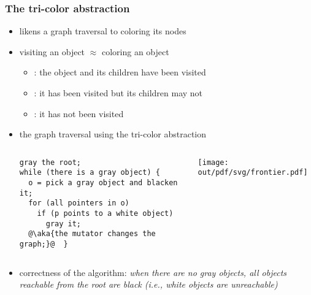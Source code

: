 \documentclass[11pt,dvipdfmx]{beamer}
\newcommand{\ao}[1]{{\color{blue}#1}}
\newcommand{\aka}[1]{{\color{red}#1}}
\begin{document}
\begin{frame}[fragile]
\frametitle{The tri-color abstraction}
\begin{itemize}
\item likens a graph traversal to coloring its nodes
\item visiting an object $\approx$ coloring an object
\begin{itemize}
\item \blackbox : the object and its children have been visited
\item \graybox : it has been visited but its children may not
\item \whitebox : it has not been visited
\end{itemize}
\item the graph traversal using the tri-color abstraction
\begin{center}
\begin{columns}
\begin{column}{0.57\textwidth}
\begin{lstlisting}
gray the root;
while (there is a gray object) {
  o = pick a gray object and blacken it;
  for (all pointers in o)
    if (p points to a white object)
      gray it;
  @\aka{the mutator changes the graph;}@  }    
\end{lstlisting}
\end{column}
\begin{column}{0.43\textwidth}
\texttt{[image: out/pdf/svg/frontier.pdf]}
\end{column}
\end{columns}
\end{center}

\item correctness of the algorithm:
  \ao{\it when there are no gray objects,
    all objects reachable from the root are black
    (i.e., white objects are unreachable)}

\end{itemize}
\end{frame}
\fi
\end{document}
